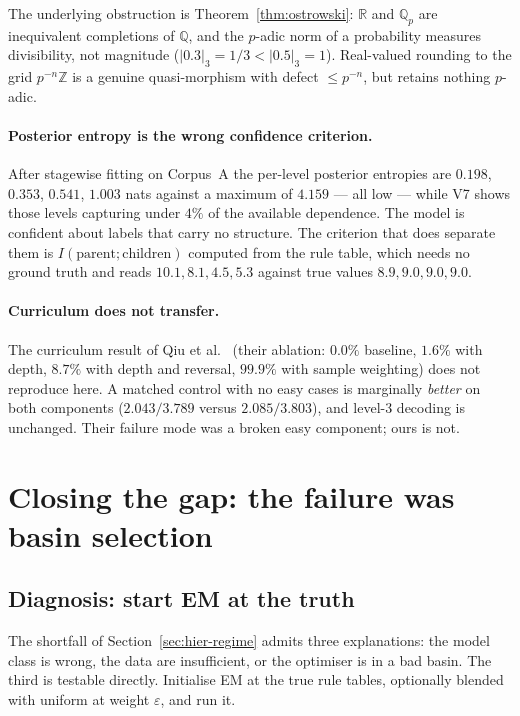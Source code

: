 \noindent
The underlying obstruction is Theorem~\ref{thm:ostrowski}: $\mathbb{R}$ and
$\mathbb{Q}_p$ are inequivalent completions of $\mathbb{Q}$, and the $p$-adic
norm of a probability measures divisibility, not magnitude ($|0.3|_3 = 1/3 <
|0.5|_3 = 1$). Real-valued rounding to the grid $p^{-n}\mathbb{Z}$ is a genuine
quasi-morphism with defect $\le p^{-n}$, but retains nothing $p$-adic.

\paragraph{Posterior entropy is the wrong confidence criterion.}
After stagewise fitting on Corpus~A the per-level posterior entropies are
$0.198$, $0.353$, $0.541$, $1.003$ nats against a maximum of $4.159$ --- all
low --- while V7 shows those levels capturing under $4\%$ of the available
dependence. The model is confident about labels that carry no structure. The
criterion that does separate them is $I(\text{parent};\text{children})$
computed from the rule table, which needs no ground truth and reads
$10.1, 8.1, 4.5, 5.3$ against true values $8.9, 9.0, 9.0, 9.0$.

\paragraph{Curriculum does not transfer.}
The curriculum result of Qiu et al.~\cite{qiu2024} (their ablation: $0.0\%$
baseline, $1.6\%$ with depth, $8.7\%$ with depth and reversal, $99.9\%$ with
sample weighting) does not reproduce here. A matched control with no easy
cases is marginally \emph{better} on both components
($2.043/3.789$ versus $2.085/3.803$), and level-3 decoding is unchanged.
Their failure mode was a broken easy component; ours is not.




\section{Closing the gap: the failure was basin selection}
\label{sec:hier-splitmerge}

\subsection{Diagnosis: start EM at the truth}

The shortfall of Section~\ref{sec:hier-regime} admits three explanations: the
model class is wrong, the data are insufficient, or the optimiser is in a bad
basin. The third is testable directly. Initialise EM at the true rule tables,
optionally blended with uniform at weight $\varepsilon$, and run it.

